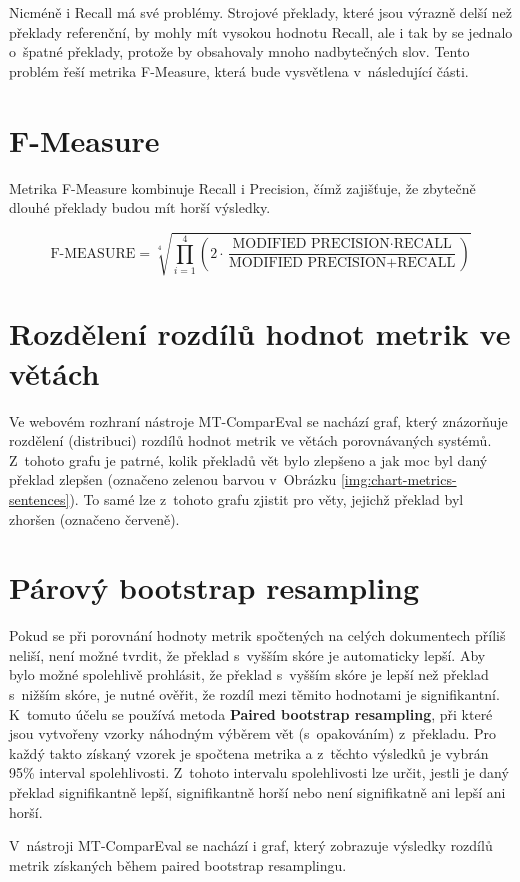 Nicméně i Recall má své problémy.
Strojové překlady,
  které jsou výrazně delší než překlady referenční,
  by mohly mít vysokou hodnotu Recall,
  ale i tak by se jednalo o~špatné překlady,
  protože by obsahovaly mnoho nadbytečných slov. 
Tento problém řeší metrika F-Measure,
  která bude vysvětlena v~následující části.

\section{F-Measure}
Metrika F-Measure kombinuje Recall i Precision,
  čímž zajišťuje, 
  že zbytečně dlouhé překlady budou mít horší výsledky.

$$ \text{F-MEASURE} = \sqrt[4]{ \prod_{i=1}^{4} \left( 2 \cdot \frac{\text{MODIFIED PRECISION} \cdot \text{RECALL}}{\text{MODIFIED PRECISION} + \text{RECALL}} \right) } $$


\section{Rozdělení rozdílů hodnot metrik ve větách}
Ve webovém rozhraní nástroje \mbox{MT-ComparEval} se nachází graf,
  který znázorňuje rozdělení (distribuci) rozdílů hodnot metrik ve větách porovnávaných systémů.
Z~tohoto grafu je patrné, kolik překladů vět bylo zlepšeno a jak moc byl daný překlad zlepšen (označeno zelenou barvou v~Obrázku \ref{img:chart-metrics-sentences}).
To samé lze z~tohoto grafu zjistit pro věty, jejichž překlad byl zhoršen (označeno červeně).

\section{Párový bootstrap resampling}
Pokud se při porovnání hodnoty metrik spočtených na celých dokumentech příliš neliší,
  není možné tvrdit, že překlad s~vyšším skóre je automaticky lepší.
Aby bylo možné spolehlivě prohlásit, že překlad s~vyšším skóre je lepší než překlad s~nižším skóre,
  je nutné ověřit, že rozdíl mezi těmito hodnotami je signifikantní.
K~tomuto účelu se používá metoda \textbf{Paired bootstrap resampling}, %
  při které jsou vytvořeny  vzorky náhodným výběrem vět (s~opakováním) z~překladu.
Pro každý takto získaný vzorek je spočtena metrika a z~těchto výsledků je vybrán 95\% interval spolehlivosti.
Z~tohoto intervalu spolehlivosti lze určit, jestli je daný překlad signifikantně lepší, signifikantně horší nebo není signifikatně ani lepší ani horší.

V~nástroji \mbox{MT-ComparEval} se nachází i graf, který zobrazuje výsledky rozdílů metrik získaných během paired bootstrap resamplingu.



